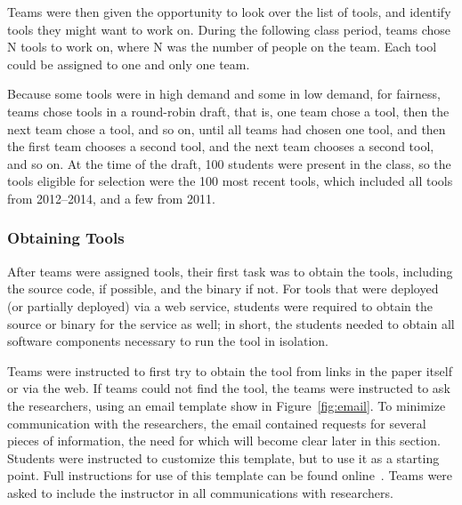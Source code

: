 \documentclass[10pt,conference]{IEEEtran}
\begin{document}
Teams were then given the opportunity to look over the list of
tools, and identify tools they might want to work on.
During the following class period, teams chose N tools to work on,
where N was the number of people on the team.
Each tool could be assigned to one and only one team.

Because some tools were in high demand and some in low demand, for fairness,
teams chose tools in a round-robin draft,
that is, one team chose a tool, then the next team chose a tool, and so on,
until all teams had chosen one tool, and then the first team chooses a second
tool, and the next team chooses a second tool, and so on.
At the time of the draft, 100 students were present in the class, so the tools eligible
for selection were the 100 most recent tools, which included all tools
from 2012--2014, and a few from 2011.

\subsubsection{Obtaining Tools}

After teams were assigned tools, their first task was to 
obtain the tools, including the source code, if possible,
and the binary if not.
For tools that were deployed (or partially deployed) via a web service, 
students were required to obtain the source or binary for
the service as well; in short, the students needed to
obtain all software components necessary to run the tool
in isolation. 

Teams were instructed to first try to 
obtain the tool from links in the paper itself or via
the web.
If teams could not find the tool, the teams
were instructed to ask the researchers, using an email
template show in Figure~\ref{fig:email}.
To minimize communication with the researchers, 
the email contained requests for several
pieces of information, the need for which will become 
clear later in this section.
Students were instructed to customize this template,
but to use it as a starting point. 
Full instructions for use of this template can be found 
online~\cite{email}.
Teams were asked to include the instructor in
all communications with researchers.
\end{document}
